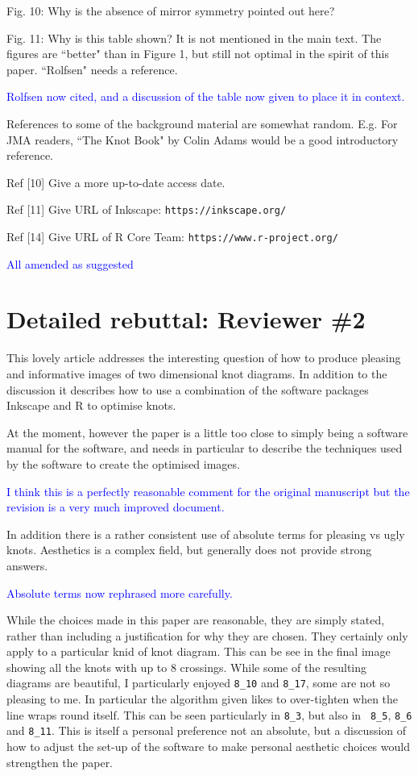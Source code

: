 \documentclass[12pt]{article}
\begin{document}
Fig. 10: Why is the absence of mirror symmetry pointed out here?

Fig. 11: Why is this table shown?  It is not mentioned in the main
text.  The figures are ``better" than in Figure 1, but still not
optimal in the spirit of this paper.  ``Rolfsen" needs a reference.


\textcolor{blue}{Rolfsen now cited, and a discussion of the table now
  given to place it in context.}

References to some of the background material are somewhat random.
E.g.  For JMA readers, ``The Knot Book" by Colin Adams would be a good
introductory reference.

Ref [10]  Give a more up-to-date access date.

Ref [11]  Give URL of  Inkscape:  {\tt https://inkscape.org/}

Ref [14]  Give URL of  R Core Team:  {\tt https://www.r-project.org/}


\textcolor{blue}{All amended as suggested}

\section*{Detailed rebuttal: Reviewer \#2}

This lovely article addresses the interesting question of
how to produce pleasing and informative images of two dimensional knot
diagrams. In addition to the discussion it describes how to use a
combination of the software packages Inkscape and R to optimise knots.

At the moment, however the paper is a little too close to simply being
a software manual for the software, and needs in particular to
describe the techniques used by the software to create the optimised
images.%

\textcolor{blue}{I think this is a perfectly reasonable comment for
  the original manuscript but the revision is a very much improved
  document.}


In addition there is a rather consistent use of absolute terms for
pleasing vs ugly knots. Aesthetics is a complex field, but generally
does not provide strong answers.


\textcolor{blue}{Absolute terms now rephrased more carefully.}%

While the choices made in this paper
are reasonable, they are simply stated, rather than including a
justification for why they are chosen. They certainly only apply to a
particular knid of knot diagram. This can be see in the final image
showing all the knots with up to 8 crossings. While some of the
resulting diagrams are beautiful, I particularly enjoyed {\tt 8\_10}
and {\tt 8\_17}, some are not so pleasing to me. In particular the
algorithm given likes to over-tighten when the line wraps round
itself. This can be seen particularly in {\tt 8\_3}, but also in {\tt
  8\_5}, {\tt 8\_6} and {\tt 8\_11}. This is itself a personal
preference not an absolute, but a discussion of how to adjust the
set-up of the software to make personal aesthetic choices would
strengthen the paper.
\end{document}
